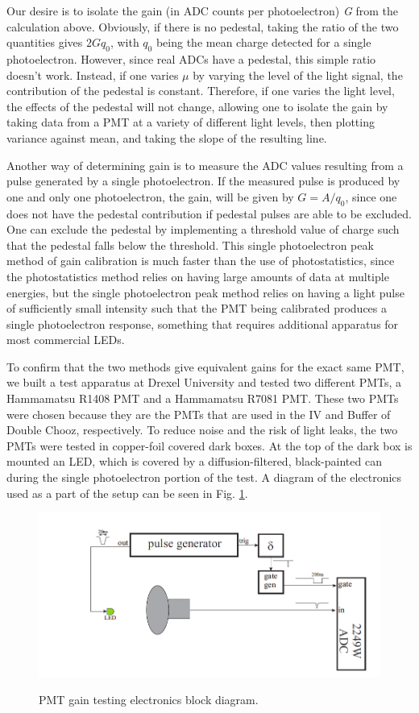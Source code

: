Our desire is to isolate the gain (in ADC counts per photoelectron) {\it G} from the calculation above. Obviously, if there is no pedestal, taking the ratio of the two quantities gives $2Gq_0$, with $q_0$ being the mean charge detected for a single photoelectron. However, since real ADCs have a pedestal, this simple ratio doesn't work. Instead, if one varies $\mu$ by varying the level of the light signal, the contribution of the pedestal is constant. Therefore, if one varies the light level, the effects of the pedestal will not change, allowing one to isolate the gain by taking data from a PMT at a variety of different light levels, then plotting variance against mean, and taking the slope of the resulting line. 

Another way of determining gain is to measure the ADC values resulting from a pulse generated by a single photoelectron. If the measured pulse is produced by one and only one photoelectron, the gain, will be given by $G= A/q_0$, since one does not have the pedestal contribution if pedestal pulses are able to be excluded. One can exclude the pedestal by implementing a threshold value of charge such that the pedestal falls below the threshold. This single photoelectron peak method of gain calibration is much faster than the use of photostatistics, since the photostatistics method relies on having large amounts of data at multiple energies, but the single photoelectron peak method relies on having a light pulse of sufficiently small intensity such that the PMT being calibrated produces a single photoelectron response, something that requires additional apparatus for most commercial LEDs. 

To confirm that the two methods give equivalent gains for the exact same PMT, we built a test apparatus at Drexel University and tested two different PMTs, a Hammamatsu R1408 PMT  and a Hammamatsu R7081 PMT. These two PMTs were chosen because they are the PMTs that are used in the IV and Buffer of Double Chooz, respectively. To reduce noise and the risk of light leaks, the two PMTs were tested in copper-foil covered dark boxes. At the top of the dark box is mounted an LED, which is covered by a diffusion-filtered, black-painted can during the single photoelectron portion of the test. A diagram of the electronics used as a part of the setup can be seen in Fig. \ref{PMT Test Setup}.

\begin{figure}
\caption{PMT gain testing electronics block diagram.}
\includegraphics[width=\textwidth]{DC_Results/PMT_Electronics.jpg}
\label{PMT Test Setup}
\end{figure}


